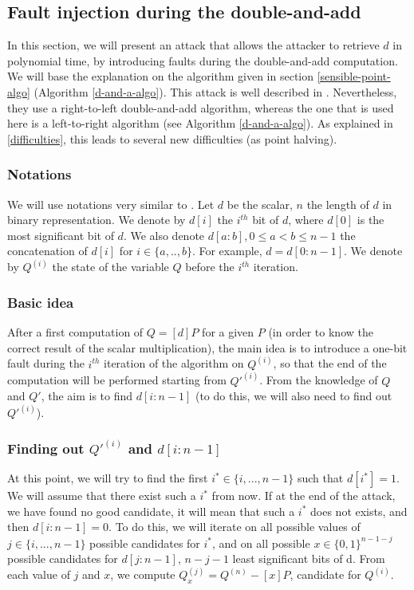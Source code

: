 \documentclass[journal]{IEEEtran}
\begin{document}
\subsection{Fault injection during the double-and-add}
\label{attack-powa}
In this section, we will present an attack that allows the attacker to retrieve $d$ in polynomial time, by
introducing faults during the double-and-add computation. We will base the explanation on the algorithm given
in section \ref{sensible-point-algo} (Algorithm \ref{d-and-a-algo}). This attack is well described in \cite{biehl2000differential}.
Nevertheless, they use a right-to-left double-and-add algorithm, whereas the one that is used here is a left-to-right algorithm (see Algorithm \ref{d-and-a-algo}).
As explained in \ref{difficulties}, this leads to several new difficulties (as point halving).\\

\subsubsection{Notations}
We will use notations very similar to \cite{biehl2000differential}.
Let $d$ be the scalar, $n$ the length of $d$ in binary representation. We denote by $d[i]$ the $i^{th}$ bit of $d$, 
where $d[0]$ is the most significant bit of $d$. We also denote $d[a:b], 0 \leq a < b \leq n-1$ the concatenation of $d[i]$ for $i \in \{a, .., b\}$.
For example, $d = d[0:n-1]$.
We denote by $Q^{(i)}$ the state of the variable $Q$ before the $i^{th}$ iteration.\\

\subsubsection{Basic idea} 
After a first computation of $Q = [d]P$ for a given $P$ (in order to know the correct result of the scalar multiplication), the main idea 
is to introduce a one-bit fault during the $i^{th}$ iteration of the algorithm on $Q^{(i)}$, so that the end of the computation
will be performed starting from $Q'^{(i)}$. From the knowledge of $Q$ and $Q'$, the aim is to find $d[i:n-1]$ (to do this, we will also need 
to find out $Q'^{(i)}$).\\

\subsubsection{Finding out $Q'^{(i)}$ and $d[i:n-1]$}
At this point, we will try to find the first $i^* \in \{i, ..., n-1\}$ such that $d[i^*] = 1$. We will assume that there exist such a $i^*$ from now.
If at the end of the attack, we have found no good candidate, it will mean that such a $i^*$ does not exists, and then $d[i:n-1] = 0$.
To do this, we will iterate on all possible values of $j \in \{i, ..., n-1\}$ possible candidates for $i^*$, and on all possible $x \in \{0, 1\}^{n-1-j}$ 
possible candidates for $d[j:n-1]$, $n - j - 1$ least significant bits of d.
From each value of $j$ and $x$, we compute $Q_x^{(j)} = Q^{(n)} - [x]P$, candidate for $Q^{(i)}$. \\
\end{document}
